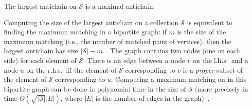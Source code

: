 \begin{fact}\label{fact:largestantichain}
	The largest antichain on $\mathcal{S}$ is a maximal antichain.
\end{fact}

Computing the size of the largest antichain on a collection $\mathcal{S}$ is
equivalent to finding the maximum matching in a bipartite graph: if $m$ is the
size of the maximum matching (i.e., the number of matched pairs of vertices),
then the largest antichain has size $|\mathcal{S}|-m$~\citep{FordF62}. The graph
contains two nodes (one on each side) for each element of $\mathcal{S}$. There
is an edge between a node $v$ on the l.h.s.~and a node $u$ on the r.h.s.~iff the
element of $\mathcal{S}$ corresponding to $v$ is a \emph{proper} subset of the
element of $\mathcal{S}$ corresponding to $u$. Computing a maximum matching on
in this bipartite graph can be done in polynomial time in the size of
$\mathcal{S}$ (more precisely in time $O(\sqrt{|\mathcal{S}|}|E|)$, where $|E|$
is the number of edges in the graph)~\citep{HopcroftK73}.

